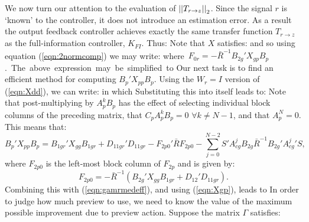 We now turn our attention to the evaluation of $\left|\left| T_{r\rightarrow z} \right|\right|_2$. Since the signal $r$ is `known' to the controller, it does not introduce an estimation error. As a result the output feedback controller achieves exactly the same transfer function $T_{r\rightarrow z}$ as the full-information controller, $K_{FI}$. Thus:
%
Note that $X$ satisfies: 
and so using equation (\ref{eqn:2normcomp}) we may write:
\mbox{where $F_{0r}=-{\bar R}^{-1}B_{2g}'X_{gp}B_p$. The above expression may be simplified to} 
%
Our next task is to find an efficient method for computing $B_p'X_{pp}B_p$. Using the $W_r=I$ version of (\ref{eqn:Xdd}), we can write:
in which
Substituting this into itself leads to:
%
Note that post-multiplying by $A_p^kB_p$ has the effect of selecting individual block columns of the preceding matrix, that $C_pA_p^kB_p=0 \,\, \forall k \neq N-1$, and that $A_p^N=0$. This means that:
%
\[
B_p'X_{pp}B_p=B_{1gr}'X_{gg}B_{1gr}+D_{11gr}'D_{11gr}-F_{2p0}'\bar{R}F_{2p0} - \sum_{j=0}^{N-2}S' A^j_{cg} B_{2g} {\bar R}^{-1} B_{2g}' {A^j_{cg}}' S,
\]
where $F_{2p0}$ is the left-most block column of $F_{2p}$ and is given by:
\begin{equation}
F_{2p0}=-\bar R^{-1}\left(B_{2g}'X_{gg}B_{1gr}+D_{12}'D_{11gr}\right). \label{eqn:F2p0}
\end{equation}
%
Combining this with (\ref{eqn:gamrmedeff}), and using (\ref{eqn:Xgp}), leads to 
In order to judge how much preview to use, we need to know the value of the maximum possible improvement due to preview action. Suppose the matrix $\Gamma$ satisfies:
